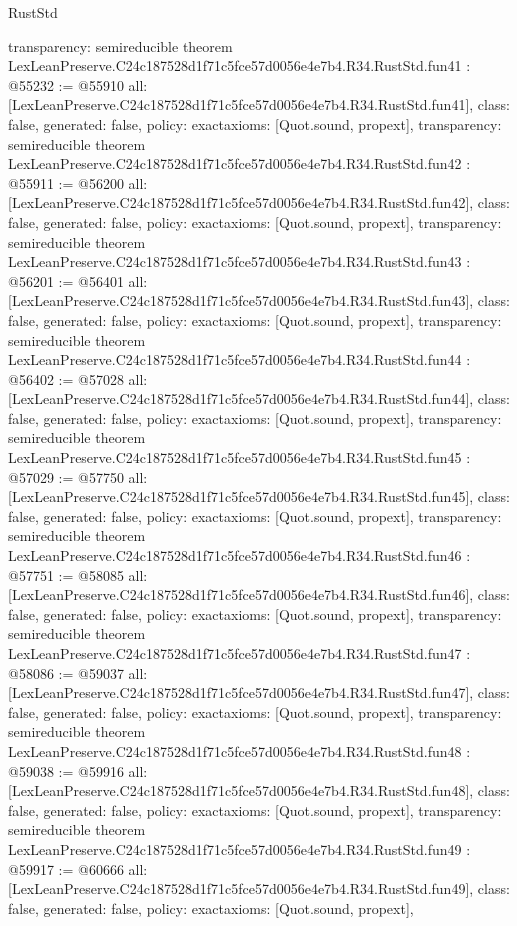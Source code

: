 \begin{lexlean}{RustStd}
\begin{coremodule}
{  transparency: semireducible
}
theorem LexLeanPreserve.C24c187528d1f71c5fce57d0056e4e7b4.R34.RustStd.fun41 : @55232 := @55910 {
  all: [LexLeanPreserve.C24c187528d1f71c5fce57d0056e4e7b4.R34.RustStd.fun41],
  class: false,
  generated: false,
  policy: exact{axioms: [Quot.sound, propext]},
  transparency: semireducible
}
theorem LexLeanPreserve.C24c187528d1f71c5fce57d0056e4e7b4.R34.RustStd.fun42 : @55911 := @56200 {
  all: [LexLeanPreserve.C24c187528d1f71c5fce57d0056e4e7b4.R34.RustStd.fun42],
  class: false,
  generated: false,
  policy: exact{axioms: [Quot.sound, propext]},
  transparency: semireducible
}
theorem LexLeanPreserve.C24c187528d1f71c5fce57d0056e4e7b4.R34.RustStd.fun43 : @56201 := @56401 {
  all: [LexLeanPreserve.C24c187528d1f71c5fce57d0056e4e7b4.R34.RustStd.fun43],
  class: false,
  generated: false,
  policy: exact{axioms: [Quot.sound, propext]},
  transparency: semireducible
}
theorem LexLeanPreserve.C24c187528d1f71c5fce57d0056e4e7b4.R34.RustStd.fun44 : @56402 := @57028 {
  all: [LexLeanPreserve.C24c187528d1f71c5fce57d0056e4e7b4.R34.RustStd.fun44],
  class: false,
  generated: false,
  policy: exact{axioms: [Quot.sound, propext]},
  transparency: semireducible
}
theorem LexLeanPreserve.C24c187528d1f71c5fce57d0056e4e7b4.R34.RustStd.fun45 : @57029 := @57750 {
  all: [LexLeanPreserve.C24c187528d1f71c5fce57d0056e4e7b4.R34.RustStd.fun45],
  class: false,
  generated: false,
  policy: exact{axioms: [Quot.sound, propext]},
  transparency: semireducible
}
theorem LexLeanPreserve.C24c187528d1f71c5fce57d0056e4e7b4.R34.RustStd.fun46 : @57751 := @58085 {
  all: [LexLeanPreserve.C24c187528d1f71c5fce57d0056e4e7b4.R34.RustStd.fun46],
  class: false,
  generated: false,
  policy: exact{axioms: [Quot.sound, propext]},
  transparency: semireducible
}
theorem LexLeanPreserve.C24c187528d1f71c5fce57d0056e4e7b4.R34.RustStd.fun47 : @58086 := @59037 {
  all: [LexLeanPreserve.C24c187528d1f71c5fce57d0056e4e7b4.R34.RustStd.fun47],
  class: false,
  generated: false,
  policy: exact{axioms: [Quot.sound, propext]},
  transparency: semireducible
}
theorem LexLeanPreserve.C24c187528d1f71c5fce57d0056e4e7b4.R34.RustStd.fun48 : @59038 := @59916 {
  all: [LexLeanPreserve.C24c187528d1f71c5fce57d0056e4e7b4.R34.RustStd.fun48],
  class: false,
  generated: false,
  policy: exact{axioms: [Quot.sound, propext]},
  transparency: semireducible
}
theorem LexLeanPreserve.C24c187528d1f71c5fce57d0056e4e7b4.R34.RustStd.fun49 : @59917 := @60666 {
  all: [LexLeanPreserve.C24c187528d1f71c5fce57d0056e4e7b4.R34.RustStd.fun49],
  class: false,
  generated: false,
  policy: exact{axioms: [Quot.sound, propext]},
}
\end{coremodule}
\end{lexlean}
